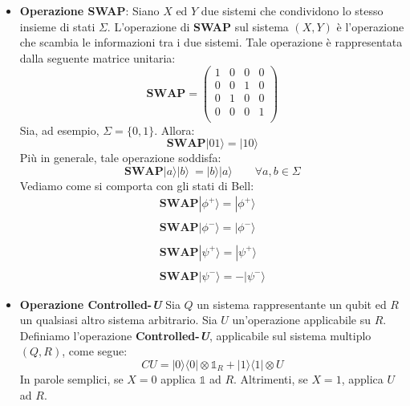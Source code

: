 \begin{itemize}
    \item \textbf{Operazione SWAP}:
    Siano $X$ ed $Y$ due sistemi che condividono lo stesso insieme di stati $\Sigma$. L'operazione di \textbf{SWAP} sul sistema $(X,Y)$ è l'operazione che scambia le informazioni tra i due sistemi. Tale operazione è rappresentata dalla seguente matrice unitaria:
    \begin{equation*}
        \textbf{SWAP} = \left(\begin{array}{cccc}
            1 & 0 & 0 & 0  \\
            0 & 0 & 1 & 0  \\
            0 & 1 & 0 & 0  \\
            0 & 0 & 0 & 1  \\
        \end{array}\right)
    \end{equation*}
    Sia, ad esempio, $\Sigma = \{0,1\}$. Allora:
    \begin{equation*}
        \textbf{SWAP}|01\rangle = |10\rangle
    \end{equation*}
    Più in generale, tale operazione soddisfa:
    \begin{equation*}
        \textbf{SWAP}|a\rangle|b\rangle\ = |b\rangle|a\rangle \qquad \forall a,b \in \Sigma
    \end{equation*}
    Vediamo come si comporta con gli stati di Bell:
    \begin{equation*}
        \begin{array}{l}
             \textbf{SWAP}|\phi^+\rangle = |\phi^+\rangle \\ \\
             \textbf{SWAP}|\phi^-\rangle = |\phi^-\rangle \\ \\
             \textbf{SWAP}|\psi^+\rangle = |\psi^+\rangle \\ \\
             \textbf{SWAP}|\psi^-\rangle = -|\psi^-\rangle 
        \end{array}
    \end{equation*}
    \item \textbf{Operazione Controlled-\textit{U}}
    Sia $Q$ un sistema rappresentante un qubit ed $R$ un qualsiasi altro sistema arbitrario. Sia $U$ un'operazione applicabile su $R$. Definiamo l'operazione \textbf{Controlled-\textit{U}}, applicabile sul sistema multiplo $(Q,R)$, come segue:
    \begin{equation*}
        CU = |0\rangle\langle0| \otimes \mathbb{1}_R + |1\rangle\langle1| \otimes U
    \end{equation*}
    In parole semplici, se $X = 0$ applica $\mathbb{1}$ ad $R$. Altrimenti, se $X = 1$, applica $U$ ad $R$.


\end{itemize}
